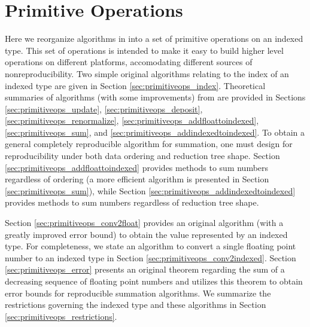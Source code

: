\section{Primitive Operations}
    \label{sec:primitiveops}
    Here we reorganize algorithms in \cite{repsum} into a set of
    primitive operations on an indexed type. This set of operations is 
    intended to make it easy to build higher level operations on different
    platforms, accomodating different sources of nonreproducibility. Two simple original algorithms
    relating to the index of an indexed type are given in Section
    \ref{sec:primitiveops_index}. Theoretical summaries of algorithms (with
    some improvements) from \cite{repsum} are provided in Sections
    \ref{sec:primitiveops_update}, \ref{sec:primitiveops_deposit},
    \ref{sec:primitiveops_renormalize},
    \ref{sec:primitiveops_addfloattoindexed}, \ref{sec:primitiveops_sum},
    and \ref{sec:primitiveops_addindexedtoindexed}. To obtain a general
    completely reproducible algorithm for summation, one must design for
    reproducibility under both data ordering and reduction tree shape.
    Section \ref{sec:primitiveops_addfloattoindexed} provides methods to
    sum numbers regardless of ordering (a more efficient algorithm is presented in Section \ref{sec:primitiveops_sum}), while Section
    \ref{sec:primitiveops_addindexedtoindexed} provides methods to sum
    numbers regardless of reduction tree shape.

    Section \ref{sec:primitiveops_conv2float} provides an original algorithm (with a greatly
    improved error bound) to obtain the value represented by an indexed type.
    For completeness, we state an algorithm to convert a single floating point number to an indexed type in Section \ref{sec:primitiveops_conv2indexed}.
    Section \ref{sec:primitiveops_error} presents an original theorem regarding the sum of a decreasing sequence of floating point numbers and utilizes this theorem to obtain error bounds for reproducible summation algorithms. We summarize the restrictions governing the indexed type and these algorithms in Section \ref{sec:primitiveops_restrictions}.

    
    
    
    
    
    
    
    
    
    
    

